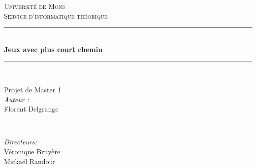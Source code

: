 \documentclass[12pt,a4paper]{report}
\theoremstyle{definition}
\theoremstyle{remark}
\begin{document}
\begin{titlepage}
	
	\newcommand{\HRule}{\rule{\linewidth}{0.5mm}} %
	
	\center %
	
	\textsc{\LARGE Université de Mons}\\[1.5cm] %
	\textsc{\Large Service d'informatique théorique }\\[0.5cm] %
	
	\vspace{1cm}
	
	\HRule \\[0.4cm]
	{ \huge \bfseries Jeux avec plus court chemin}\\[0.4cm] %
	\HRule \\[1.5cm]
	
	\vspace{2cm}
	\begin{minipage}{0.4\textwidth}
		\begin{flushleft} \large
			Projet de Master 1\\
			\emph{Auteur :} \\ \quad Florent Delgrange\\
		\end{flushleft}
	\end{minipage}
	~
	\begin{minipage}{0.4\textwidth}
		\begin{flushright} \large
			\emph{Directeurs:}\\ \quad Véronique Bruyère \\ \quad Mickaël Randour
		\end{flushright}
		
	\end{minipage}\\[5cm]
	

\end{titlepage}
\end{document}
